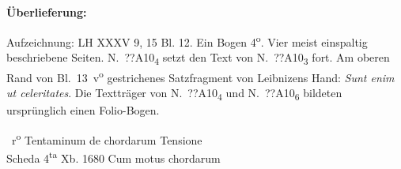 %
%
%
\begin{ledgroupsized}[r]{120mm}
\footnotesize
\pstart
\noindent\textbf{Überlieferung:}
\pend
\end{ledgroupsized}
\begin{ledgroupsized}[r]{114mm}
\footnotesize
\pstart \parindent -6mm
%
Aufzeichnung: LH XXXV 9, 15 Bl. 12.
Ein Bogen 4\textsuperscript{o}.
Vier meist einspaltig beschriebene Seiten.
N.~??A10\textsubscript{4} setzt den Text von N.~??A10\textsubscript{3} fort.
Am oberen Rand von Bl.~13~v\textsuperscript{o} gestrichenes Satzfragment von Leibnizens Hand:
\textit{Sunt enim ut celeritates}.
Die Textträger von N.~??A10\textsubscript{4} und N.~??A10\textsubscript{6} bildeten ursprünglich einen Folio-Bogen.
\pend
\end{ledgroupsized}
%
%
\vspace{4mm}%
\pstart%
\count{}
\count{}
\count{}
\normalsize%
\noindent%
%
~r\textsuperscript{o}\rbrack%
%
\pend%
\pstart%
\centering%
Tentaminum\protect{}
de chordarum Tensione\protect{}\\
Scheda\protect{} 4\textsuperscript{ta}
Xb. 1680
\pend%
\vspace{0.5em}%
%
\pstart%
\noindent%
Cum
motus chordarum\protect{}%

